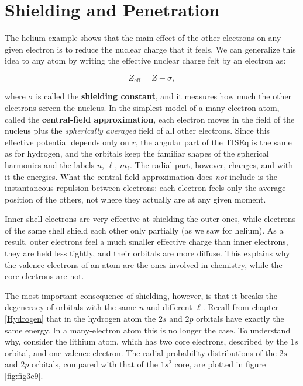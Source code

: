 \documentclass[
  english,
  9pt,
]{extbook}
\theoremstyle{definition}
\theoremstyle{definition}
\theoremstyle{definition}
\theoremstyle{definition}
\theoremstyle{remark}
\begin{document}
\section{Shielding and Penetration}\label{shielding-and-penetration}

The helium example shows that the main effect of the other electrons on any given electron is to reduce the nuclear charge that it feels. We can generalize this idea to any atom by writing the effective nuclear charge felt by an electron as:

\begin{equation}
Z_{\text{eff}} = Z - \sigma,
\label{eq:zeff}
\end{equation}

where \(\sigma\) is called the \textbf{shielding constant}, and it measures how much the other electrons screen the nucleus. In the simplest model of a many-electron atom, called the \textbf{central-field approximation}, each electron moves in the field of the nucleus plus the \emph{spherically averaged} field of all other electrons. Since this effective potential depends only on \(r\), the angular part of the TISEq is the same as for hydrogen, and the orbitals keep the familiar shapes of the spherical harmonics and the labels \(n\), \(\ell\), \(m_\ell\). The radial part, however, changes, and with it the energies. What the central-field approximation does \emph{not} include is the instantaneous repulsion between electrons: each electron feels only the average position of the others, not where they actually are at any given moment.

Inner-shell electrons are very effective at shielding the outer ones, while electrons of the same shell shield each other only partially (as we saw for helium). As a result, outer electrons feel a much smaller effective charge than inner electrons, they are held less tightly, and their orbitals are more diffuse. This explains why the valence electrons of an atom are the ones involved in chemistry, while the core electrons are not.

The most important consequence of shielding, however, is that it breaks the degeneracy of orbitals with the same \(n\) and different \(\ell\). Recall from chapter \ref{Hydrogen} that in the hydrogen atom the \(2s\) and \(2p\) orbitals have exactly the same energy. In a many-electron atom this is no longer the case. To understand why, consider the lithium atom, which has two core electrons, described by the \(1s\) orbital, and one valence electron. The radial probability distributions of the \(2s\) and \(2p\) orbitals, compared with that of the \(1s^2\) core, are plotted in figure \ref{fig:fig3c9}.
\end{document}
